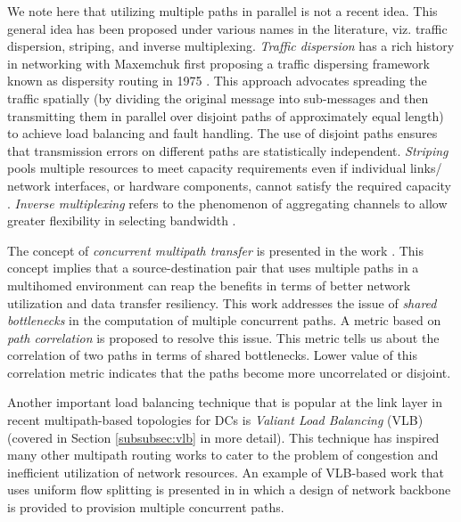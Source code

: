 \documentclass[10pt]{IEEEtran}
\begin{document}
We note here that utilizing multiple paths in parallel is not a recent idea. This general idea has been proposed under various names in the literature, viz. traffic dispersion, striping, and inverse multiplexing. \textit{Traffic dispersion} has a rich history in networking with Maxemchuk first proposing a traffic dispersing framework known as dispersity routing in 1975 \cite{maxemchuk1975}. This approach advocates spreading the traffic spatially (by dividing the original message into sub-messages and then transmitting them in parallel over disjoint paths of approximately equal length) to achieve load balancing and fault handling. The use of disjoint paths ensures that transmission errors on different paths are statistically independent. \textit{Striping} pools multiple resources to meet capacity requirements even if individual links/ network interfaces, or hardware components, cannot satisfy the required capacity \cite{adiseshu1996reliable}. \textit{Inverse multiplexing} refers to the phenomenon of aggregating channels to allow greater flexibility in selecting bandwidth \cite{fredette1994past}.

The concept of \textit{concurrent multipath transfer} is presented in the work \cite{liao2011introducing}. This concept implies that a source-destination pair that uses multiple paths in a multihomed environment can reap the benefits in terms of better network utilization and data transfer resiliency. This work addresses the issue of \textit{shared bottlenecks} in the computation of multiple concurrent paths. A metric based on \textit{path correlation} is proposed to resolve this issue. This metric tells us about the correlation of two paths in terms of shared bottlenecks. Lower value of this correlation metric indicates that the paths become more uncorrelated or disjoint.

Another important load balancing technique that is popular at the link layer in recent multipath-based topologies for DCs is \textit{Valiant Load Balancing} (VLB) \cite{valiant1982scheme, valiant1981universal, Valiant1990} (covered in Section \ref{subsubsec:vlb} in more detail). This technique has inspired many other multipath routing works to cater to the problem of congestion and inefficient utilization of network resources. An example of VLB-based work that uses uniform flow splitting is presented in \cite{zhang2008designing} in which a design of network backbone is provided to provision multiple concurrent paths. 
\end{document}

